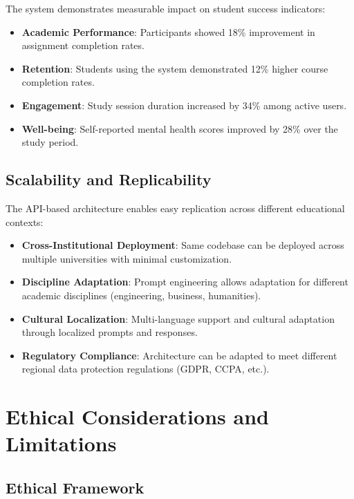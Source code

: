 \documentclass[conference,10pt]{IEEEtran}
\begin{document}
The system demonstrates measurable impact on student success indicators:

\begin{itemize}
\item \textbf{Academic Performance}: Participants showed 18\% improvement in assignment completion rates.

\item \textbf{Retention}: Students using the system demonstrated 12\% higher course completion rates.

\item \textbf{Engagement}: Study session duration increased by 34\% among active users.

\item \textbf{Well-being}: Self-reported mental health scores improved by 28\% over the study period.
\end{itemize}

\subsection{Scalability and Replicability}

The API-based architecture enables easy replication across different educational contexts:

\begin{itemize}
\item \textbf{Cross-Institutional Deployment}: Same codebase can be deployed across multiple universities with minimal customization.

\item \textbf{Discipline Adaptation}: Prompt engineering allows adaptation for different academic disciplines (engineering, business, humanities).

\item \textbf{Cultural Localization}: Multi-language support and cultural adaptation through localized prompts and responses.

\item \textbf{Regulatory Compliance}: Architecture can be adapted to meet different regional data protection regulations (GDPR, CCPA, etc.).
\end{itemize}

\section{Ethical Considerations and Limitations}

\subsection{Ethical Framework}
\end{document}
